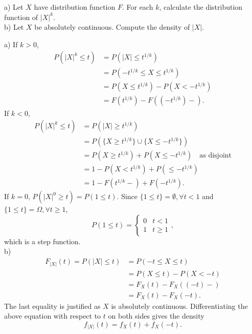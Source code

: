\begin{exercise}
  a) Let $X$ have distribution function $F$. For each $k$, calculate the distribution function of $|X|^k$. \\
  b) Let $X$ be absolutely continuous. Compute the density of $|X|$.
\end{exercise}
\begin{solution}
  a) If $k>0$,
  \begin{align*}
    P(|X|^k\leq t) &= P(|X|\leq t^{1/k}) \\
      &= P(-t^{1/k}\leq X\leq t^{1/k}) \\
      &= P(X\leq t^{1/k}) - P(X<-t^{1/k}) \\
      &= F(t^{1/k}) - F((-t^{1/k})-) .
  \end{align*}
  If $k<0$,
  \begin{align*}
    P(|X|^k\leq t) &= P(|X|\geq t^{1/k}) \\
      &= P(\{X\geq t^{1/k}\}\cup\{X\leq -t^{1/k}\}) \\
      &= P(X\geq t^{1/k}) + P(X\leq -t^{1/k}) \quad \mbox{as disjoint} \\
      &= 1 - P(X<t^{1/k}) + P(\leq -t^{1/k}) \\
      &= 1 - F(t^{1/k}-) + F(-t^{1/k}) .
  \end{align*}
  If $k=0$, $P(|X|^0\geq t) = P(1\leq t)$. Since $\{1\leq t\}=\emptyset, \forall t<1$ and $\{1\leq t\}=\Omega, \forall t\geq 1$,
  \[
    P(1\leq t) = \begin{cases}
      0 & t < 1 \\
      1 & t \geq 1
    \end{cases},
  \]
  which is a step function. \\

  b) \begin{align*}
    F_{|X|}(t) = P(|X|\leq t) &= P(-t\leq X\leq t) \\
      &= P(X\leq t) - P(X<-t) \\
      &= F_X(t) - F_X((-t)-) \\
      &= F_X(t) - F_X(-t) .
  \end{align*}
  The last equality is justified as $X$ is absolutely continuous. Differentiating the above equation with respect to $t$ on both sides gives the density
  \[ f_{|X|}(t) = f_X(t) + f_X(-t) .\]
\end{solution}

